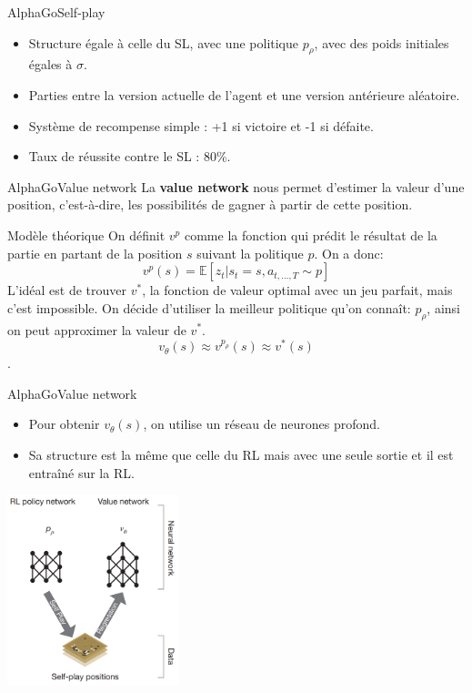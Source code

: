 \begin{frame}{AlphaGo}{Self-play}

	\begin{itemize}
		\item Structure égale à celle du SL, avec une politique $p_\rho$, avec des poids initiales égales à $\sigma$.
		\item Parties entre la version actuelle de l'agent et une version antérieure aléatoire.
		\item Système de recompense simple : +1 si victoire et -1 si défaite.
		\item Taux de réussite contre le SL : 80\%.
	\end{itemize}

\end{frame}


\begin{frame}{AlphaGo}{Value network}
	La \textbf{value network} nous permet d'estimer la valeur d'une position, c'est-à-dire, les possibilités de gagner à partir de cette position.
	\begin{block}{Modèle théorique}
		On définit $v^p$ comme la fonction qui prédit le résultat de la partie en partant de la position $s$ suivant la politique $p$. On a donc: $$v^p(s) = \mathbb{E}[z_t|s_t=s, a_{t,\dots,T}\sim p]$$
		L'idéal est de trouver $v^*$, la fonction de valeur optimal avec un jeu parfait, mais c'est impossible.
		On décide d'utiliser la meilleur politique qu'on connaît: $p_\rho$, ainsi on peut approximer la valeur de $v^*$. $$v_\theta(s) \approx v^{p_\rho}(s) \approx v^*(s)$$.
	\end{block}
\end{frame}

\begin{frame}{AlphaGo}{Value network}
	\begin{itemize}
		\item Pour obtenir $v_\theta(s)$, on utilise un réseau de neurones profond.
		\item Sa structure est la même que celle du RL mais avec une seule sortie et il est entraîné sur la RL.
	\end{itemize}
	\begin{center}
		\includegraphics[width=5cm]{ressources/RL_and_VN}
	\end{center}
\end{frame}

